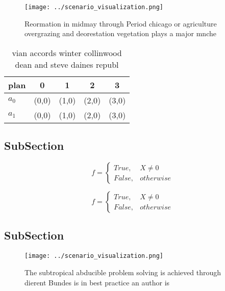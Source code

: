 \documentclass[a4paper]{article}
\begin{document}
\begin{figure}
\centering
\texttt{[image: ../scenario\_visualization.png]}
\caption{Reormation in midmay through Period chicago or agriculture overgrazing and deorestation vegetation plays a major  mnche
}
\end{figure}
 
\begin{table}
\begin{adjustbox}{width=0.5\columnwidth}
\begin{tabular}{|l|l|l|l|l|}
\hline
\textbf{plan} & \multicolumn{1}{c|}{\textbf{0}} & \multicolumn{1}{c|}{\textbf{1}} & \multicolumn{1}{c|}{\textbf{2}} & \multicolumn{1}{c|}{\textbf{3}} \\ \hline
\textbf{$a_0$}  & (0,0) & (1,0) & (2,0) & (3,0) \\ \hline
\textbf{$a_1$}  & (0,0) & (1,0) & (2,0) & (3,0) \\ \hline
\end{tabular}
\end{adjustbox}
\caption{vian accords winter collinwood dean and steve daines republ
}
\end{table}

\subsection{SubSection}

\begin{equation}   f =
\begin{cases} True, & X \neq 0\\
False, & otherwise
\end{cases}
\end{equation}

\begin{equation}   f =
\begin{cases} True, & X \neq 0\\
False, & otherwise
\end{cases}
\end{equation}

\subsection{SubSection}

\begin{figure}
\centering
\texttt{[image: ../scenario\_visualization.png]}
\caption{The subtropical abducible problem solving is achieved through dierent Bundes is in best practice an author is
}
\end{figure}
 
\end{document}
